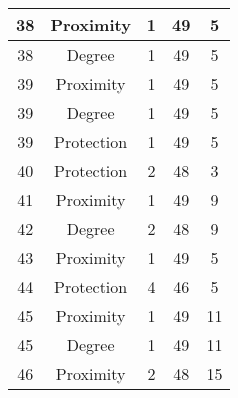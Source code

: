 \documentclass[results.tex]{subfiles}
\begin{document}
\begin{center}
\begin{tabular}{| c || c | c | c | c |}
            \hline
            38                      & Proximity                    & 1                      & 49                      & 5                    \\
            \hline
            38                      & Degree                       & 1                      & 49                      & 5                    \\
            \hline
            39                      & Proximity                    & 1                      & 49                      & 5                    \\
            \hline
            39                      & Degree                       & 1                      & 49                      & 5                    \\
            \hline
            39                      & Protection                   & 1                      & 49                      & 5                    \\
            \hline
            40                      & Protection                   & 2                      & 48                      & 3                    \\
            \hline
            41                      & Proximity                    & 1                      & 49                      & 9                    \\
            \hline
            42                      & Degree                       & 2                      & 48                      & 9                    \\
            \hline
            43                      & Proximity                    & 1                      & 49                      & 5                    \\
            \hline
            44                      & Protection                   & 4                      & 46                      & 5                    \\
            \hline
            45                      & Proximity                    & 1                      & 49                      & 11                   \\
            \hline
            45                      & Degree                       & 1                      & 49                      & 11                   \\
            \hline
            46                      & Proximity                    & 2                      & 48                      & 15                   \\

\end{tabular}
\end{center}
\end{document}
